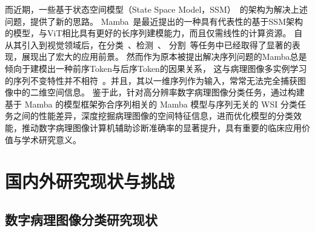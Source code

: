 而近期，一些基于状态空间模型（State Space Model，SSM）~\cite{hamilton1994state}的架构为解决上述问题，提供了新的思路。
Mamba~\cite{gu2023mamba,mamba2}是最近提出的一种具有代表性的基于SSM架构的模型，与ViT相比具有更好的长序列建模能力，而且仅需线性的计算资源。
自从其引入到视觉领域后，在分类~\cite{zhu2024vision,yue2024medmamba,DATE20250218001,yao2024spectralmamba}、检测~\cite{BJHK20241114002,ZGGL202412016,chen2024mim,zhang2025cdmamba}、
分割~\cite{GXXB20250212011,JSGG20240822004,li2025selective,wu2025h}等任务中已经取得了显著的表现，展现出了宏大的应用前景。
然而作为原本被提出解决序列问题的Mamba总是倾向于建模出一种前序Token与后序Token的因果关系，
这与病理图像多实例学习的序列不变特性并不相符~\cite{huang2024localmamba}。并且，其以一维序列作为输入，常常无法完全捕获图像中的二维空间信息。
鉴于此，针对高分辨率数字病理图像分类任务，通过构建基于 Mamba 的模型框架弥合序列相关的 Mamba 模型与序列无关的 WSI 分类任务之间的性能差异，深度挖掘病理图像的空间特征信息，进而优化模型的分类效能，推动数字病理图像计算机辅助诊断准确率的显著提升，具有重要的临床应用价值与学术研究意义。

\section[\hspace{-2pt}国内外研究现状与挑战]{{\heiti{} \hspace{-8pt}国内外研究现状与挑战}}\label{section1: 国内外研究现状与挑战}

\subsection[\hspace{-2pt}数字病理图像分类研究现状]{{\heiti{} \hspace{-8pt}数字病理图像分类研究现状}}\label{section1: 数字病理图像分类研究现状}

